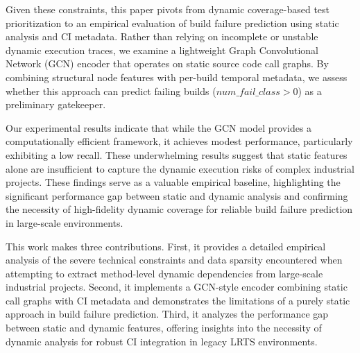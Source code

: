 Given these constraints, this paper pivots from dynamic coverage-based test prioritization to an empirical evaluation of build failure prediction using static analysis and CI metadata. Rather than relying on incomplete or unstable dynamic execution traces, we examine a lightweight Graph Convolutional Network (GCN) encoder that operates on static source code call graphs. By combining structural node features with per-build temporal metadata, we assess whether this approach can predict failing builds ($num\_fail\_class > 0$) as a preliminary gatekeeper.

Our experimental results indicate that while the GCN model provides a computationally efficient framework, it achieves modest performance, particularly exhibiting a low recall. These underwhelming results suggest that static features alone are insufficient to capture the dynamic execution risks of complex industrial projects. These findings serve as a valuable empirical baseline, highlighting the significant performance gap between static and dynamic analysis and confirming the necessity of high-fidelity dynamic coverage for reliable build failure prediction in large-scale environments.

This work makes three contributions. First, it provides a detailed empirical analysis of the severe technical constraints and data sparsity encountered when attempting to extract method-level dynamic dependencies from large-scale industrial projects. Second, it implements a GCN-style encoder combining static call graphs with CI metadata and demonstrates the limitations of a purely static approach in build failure prediction. Third, it analyzes the performance gap between static and dynamic features, offering insights into the necessity of dynamic analysis for robust CI integration in legacy LRTS environments.



